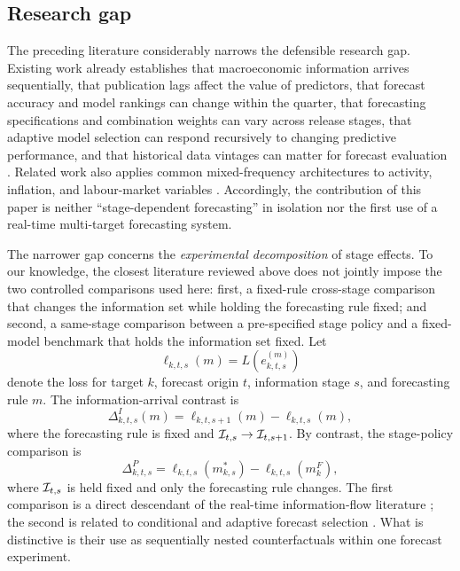\subsection{Research gap}
\label{subsec:research_gap}

The preceding literature considerably narrows the defensible research gap.
Existing work already establishes that macroeconomic information arrives
sequentially, that publication lags affect the value of predictors, that forecast
accuracy and model rankings can change within the quarter, that forecasting
specifications and combination weights can vary across release stages, that
adaptive model selection can respond recursively to changing predictive
performance, and that historical data vintages can matter for forecast
evaluation
\citep{aastveit2014density,drechselmaurin2011flow,
giacominiwhite2006conditional,koopkorobilis2012dma,
heinrichreif2025realtime}. Related work also applies common mixed-frequency
architectures to activity, inflation, and labour-market variables
\citep{heinrichreif2025realtime}. Accordingly, the contribution of this paper
is neither ``stage-dependent forecasting'' in isolation nor the first use of a
real-time multi-target forecasting system.

The narrower gap concerns the \emph{experimental decomposition} of stage
effects. To our knowledge, the closest literature reviewed above does not
jointly impose the two controlled comparisons used here: first, a fixed-rule
cross-stage comparison that changes the information set while holding the
forecasting rule fixed; and second, a same-stage comparison between a
pre-specified stage policy and a fixed-model benchmark that holds the
information set fixed. Let
\begin{equation}
    \ell_{k,t,s}(m)
    =
    L\!\left(e_{k,t,s}^{(m)}\right)
\end{equation}
denote the loss for target $k$, forecast origin $t$, information stage $s$, and
forecasting rule $m$. The information-arrival contrast is
\begin{equation}
    \Delta^{I}_{k,t,s}(m)
    =
    \ell_{k,t,s+1}(m)
    -
    \ell_{k,t,s}(m),
    \label{eq:lit_information_contrast}
\end{equation}
where the forecasting rule is fixed and
$\mathcal{I}_{t,s}\rightarrow\mathcal{I}_{t,s+1}$. By contrast, the stage-policy comparison is
\begin{equation}
    \Delta^{P}_{k,t,s}
    =
    \ell_{k,t,s}\!\left(m^{*}_{k,s}\right)
    -
    \ell_{k,t,s}\!\left(m^{F}_{k}\right),
    \label{eq:lit_policy_contrast}
\end{equation}
where $\mathcal{I}_{t,s}$ is held fixed and only the forecasting rule changes. The
first comparison is a direct descendant of the real-time information-flow
literature
\citep{giannone2008nowcasting,schorfheide2015mixedfrequency,
liebermann2014realtime}; the second is related to conditional and adaptive
forecast selection
\citep{giacominiwhite2006conditional,koopkorobilis2012dma}.
What is distinctive is their use as sequentially nested counterfactuals within
one forecast experiment.

